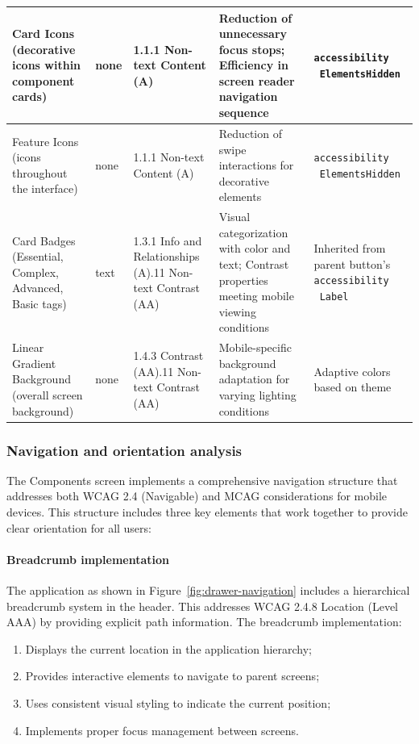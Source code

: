 \begin{longtable}[c]{|C{2.7cm}|C{1.8cm}|C{3cm}|C{3.5cm}|C{4.5cm}|}
\hline
Card Icons (decorative icons within component cards) & none & 1.1.1 Non-text Content (A) & Reduction of unnecessary focus stops; Efficiency in screen reader navigation sequence & \texttt{accessibility \ ElementsHidden} \\
\hline
Feature Icons (icons throughout the interface) & none & 1.1.1 Non-text Content (A) & Reduction of swipe interactions for decorative elements & \texttt{accessibility \ ElementsHidden} \\
\hline
Card Badges (Essential, Complex, Advanced, Basic tags) & text & 1.3.1 Info and Relationships (A).11 Non-text Contrast (AA) & Visual categorization with color and text; Contrast properties meeting mobile viewing conditions & Inherited from parent button's \texttt{accessibility \ Label} \\
\hline
Linear Gradient Background (overall screen background) & none & 1.4.3 Contrast (AA).11 Non-text Contrast (AA) & Mobile-specific background adaptation for varying lighting conditions & Adaptive colors based on theme \\
\hline
\end{longtable}

\FloatBarrier

\subsubsection{Navigation and orientation analysis}

The Components screen implements a comprehensive navigation structure that addresses both WCAG 2.4 (Navigable) and MCAG considerations for mobile devices. This structure includes three key elements that work together to provide clear orientation for all users:

\paragraph{Breadcrumb implementation}

The application as shown in Figure~\ref{fig:drawer-navigation} includes a hierarchical breadcrumb system in the header. This addresses WCAG 2.4.8 Location (Level AAA) by providing explicit path information. The breadcrumb implementation:

\begin{enumerate}
    \item Displays the current location in the application hierarchy;
    \item Provides interactive elements to navigate to parent screens;
    \item Uses consistent visual styling to indicate the current position;
    \item Implements proper focus management between screens.
\end{enumerate}

